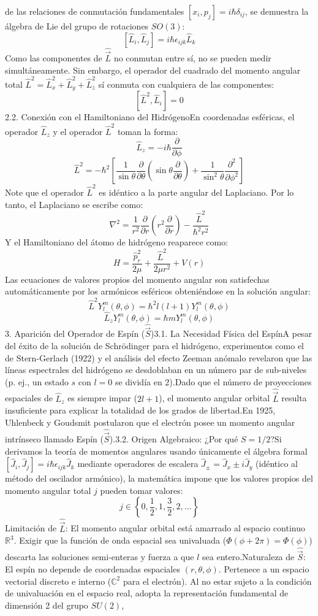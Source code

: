 \documentclass{article}
\begin{document}
de las relaciones de conmutación fundamentales $[x_i, p_j] = i\hbar \delta_{ij}$, se demuestra la álgebra de Lie del grupo de rotaciones $SO(3)$:$$[\hat{L}_i, \hat{L}_j] = i\hbar \epsilon_{ijk} \hat{L}_k$$Como las componentes de $\hat{\vec{L}}$ no conmutan entre sí, no se pueden medir simultáneamente. Sin embargo, el operador del cuadrado del momento angular total $\hat{L}^2 = \hat{L}_x^2 + \hat{L}_y^2 + \hat{L}_z^2$ sí conmuta con cualquiera de las componentes:$$[\hat{L}^2, \hat{L}_i] = 0$$2.2. Conexión con el Hamiltoniano del HidrógenoEn coordenadas esféricas, el operador $\hat{L}_z$ y el operador $\hat{L}^2$ toman la forma:$$\hat{L}_z = -i\hbar \frac{\partial}{\partial \phi}$$$$\hat{L}^2 = -\hbar^2 \left[ \frac{1}{\sin\theta}\frac{\partial}{\partial\theta}\left(\sin\theta \frac{\partial}{\partial\theta}\right) + \frac{1}{\sin^2\theta}\frac{\partial^2}{\partial\phi^2} \right]$$Note que el operador $\hat{L}^2$ es idéntico a la parte angular del Laplaciano. Por lo tanto, el Laplaciano se escribe como:   $$\nabla^2 = \frac{1}{r^2}\frac{\partial}{\partial r}\left(r^2 \frac{\partial}{\partial r}\right) - \frac{\hat{L}^2}{\hbar^2 r^2}$$Y el Hamiltoniano del átomo de hidrógeno reaparece como:$$H = \frac{\hat{p}_r^2}{2\mu} + \frac{\hat{L}^2}{2\mu r^2} + V(r)$$Las ecuaciones de valores propios del momento angular son satisfechas automáticamente por los armónicos esféricos obteniéndose en la solución angular:$$\hat{L}^2 Y_l^m(\theta, \phi) = \hbar^2 l(l+1) Y_l^m(\theta, \phi)$$$$\hat{L}_z Y_l^m(\theta, \phi) = \hbar m Y_l^m(\theta, \phi)$$3. Aparición del Operador de Espín ($\hat{\vec{S}}$)3.1. La Necesidad Física del EspínA pesar del éxito de la solución de Schrödinger para el hidrógeno, experimentos como el de Stern-Gerlach (1922) y el análisis del efecto Zeeman anómalo revelaron que las líneas espectrales del hidrógeno se desdoblaban en un número par de sub-niveles (p. ej., un estado $s$ con $l=0$ se dividía en 2).Dado que el número de proyecciones espaciales de $\hat{L}_z$ es siempre impar ($2l+1$), el momento angular orbital $\hat{\vec{L}}$ resulta insuficiente para explicar la totalidad de los grados de libertad.En 1925, Uhlenbeck y Goudsmit postularon que el electrón posee un momento angular intrínseco llamado Espín ($\hat{\vec{S}}$).3.2. Origen Algebraico: ¿Por qué $S = 1/2$?Si derivamos la teoría de momentos angulares usando únicamente el álgebra formal $[\hat{J}_i, \hat{J}_j] = i\hbar \epsilon_{ijk} \hat{J}_k$ mediante operadores de escalera $\hat{J}_\pm = \hat{J}_x \pm i\hat{J}_y$ (idéntico al método del oscilador armónico), la matemática impone que los valores propios del momento angular total $j$ pueden tomar valores:$$j \in \left\{0, \frac{1}{2}, 1, \frac{3}{2}, 2, \dots\right\}$$Limitación de $\hat{\vec{L}}$: El momento angular orbital está amarrado al espacio continuo $\mathbb{R}^3$. Exigir que la función de onda espacial sea univaluada ($\Phi(\phi+2\pi) = \Phi(\phi)$) descarta las soluciones semi-enteras y fuerza a que $l$ sea entero.Naturaleza de $\hat{\vec{S}}$: El espín no depende de coordenadas espaciales $(r, \theta, \phi)$. Pertenece a un espacio vectorial discreto e interno ($\mathbb{C}^2$ para el electrón). Al no estar sujeto a la condición de univaluación en el espacio real, adopta la representación fundamental de dimensión 2 del grupo $SU(2)$, 
\end{document}
